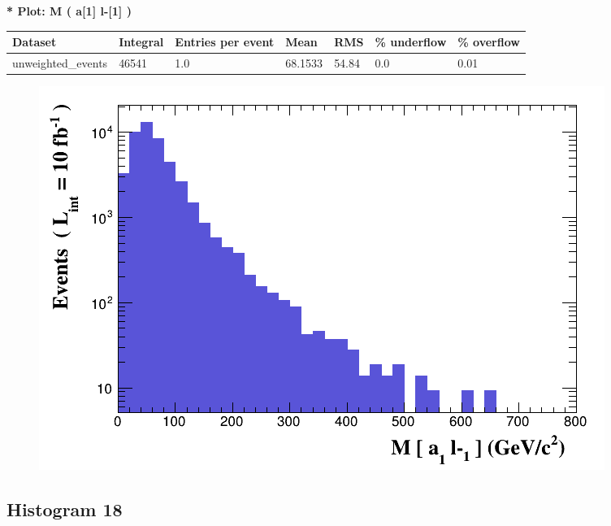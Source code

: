 \documentclass[a4paper, 10pt]{article}
\begin{document}
\textbf{* Plot: M ( a[1] l-[1] ) }\\
   \begin{table}[H]
  \begin{center}
    \begin{tabular}{|m{23.0mm}|m{23.0mm}|m{18.0mm}|m{19.0mm}|m{19.0mm}|m{19.0mm}|m{19.0mm}|}
      \hline
      {\cellcolor{yellow}         Dataset}& {\cellcolor{yellow}         Integral}& {\cellcolor{yellow}         Entries per event}& {\cellcolor{yellow}         Mean}& {\cellcolor{yellow}         RMS}& {\cellcolor{yellow}         \% underflow}& {\cellcolor{yellow}         \% overflow}\\
      \hline
      {\cellcolor{white}         unweighted\_events}& {\cellcolor{white}         46541}& {\cellcolor{white}         1.0}& {\cellcolor{white}         68.1533}& {\cellcolor{white}         54.84}& {\cellcolor{green}         0.0}& {\cellcolor{green}         0.01}\\
\hline
    \end{tabular}
  \end{center}
\end{table}

\begin{figure}[H]
  \begin{center}
    \includegraphics[scale=0.45]{selection_16.png}\\
\caption{   }
  \end{center}
\end{figure}
      \newpage
\subsection{ Histogram 18}
\end{document}
